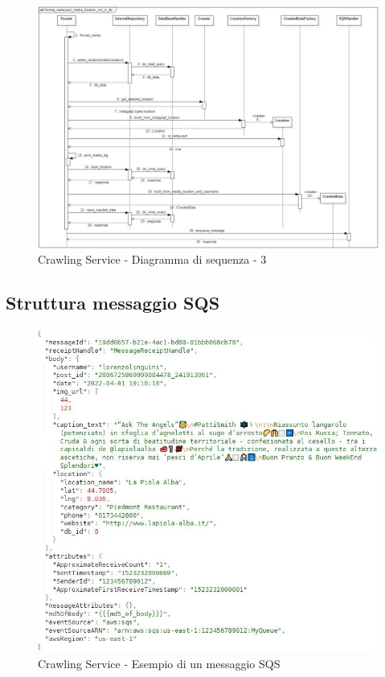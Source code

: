 \begin{figure}[!htp]
    \centering
    \includegraphics[scale=0.45]{Contenuto/Immagini/seq3-CS.JPG}
    \caption{Crawling Service - Diagramma di sequenza - 3}
\end{figure}

\subsection{Struttura messaggio SQS}
\begin{figure}[H]
    \centerfloat
    \includegraphics[scale=0.55]{Contenuto/Immagini/messaggiosqs.JPG}
    \caption{Crawling Service - Esempio di un messaggio SQS}
\end{figure}

